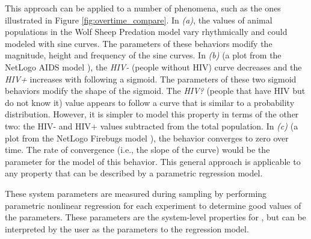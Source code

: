 This approach can be applied to a number of phenomena, such as the ones illustrated in Figure \ref{fig:overtime_compare}.
In \textit{(a)}, the values of animal populations in the Wolf Sheep Predation model vary rhythmically and could modeled with sine curves.
The parameters of these behaviors modify the magnitude, height and frequency of the sine curves.
In \textit{(b)} (a plot from the NetLogo AIDS model \cite{aids}), the \textit{HIV-} (people without HIV) curve decreases and the \textit{HIV+} increases with following a sigmoid.
The parameters of these two sigmoid behaviors modify the shape of the sigmoid.
The \textit{HIV?} (people that have HIV but do not know it) value appears to follow a curve that is similar to a probability distribution. 
However, it is simpler to model this property in terms of the other two: the HIV- and HIV+ values subtracted from the total population.
In \textit{(c)} (a plot from the NetLogo Firebugs model \cite{bugs}), the behavior converges to zero over time.
The rate of convergence (i.e., the slope of the curve) would be the parameter for the model of this behavior.
This general approach is applicable to any property that can be described by a parametric regression model.

These system parameters are measured during sampling by performing parametric nonlinear regression for each experiment
to determine good values of the parameters.
These parameters are the system-level properties for \fw, but can be interpreted by the user as the parameters to the regression model.


